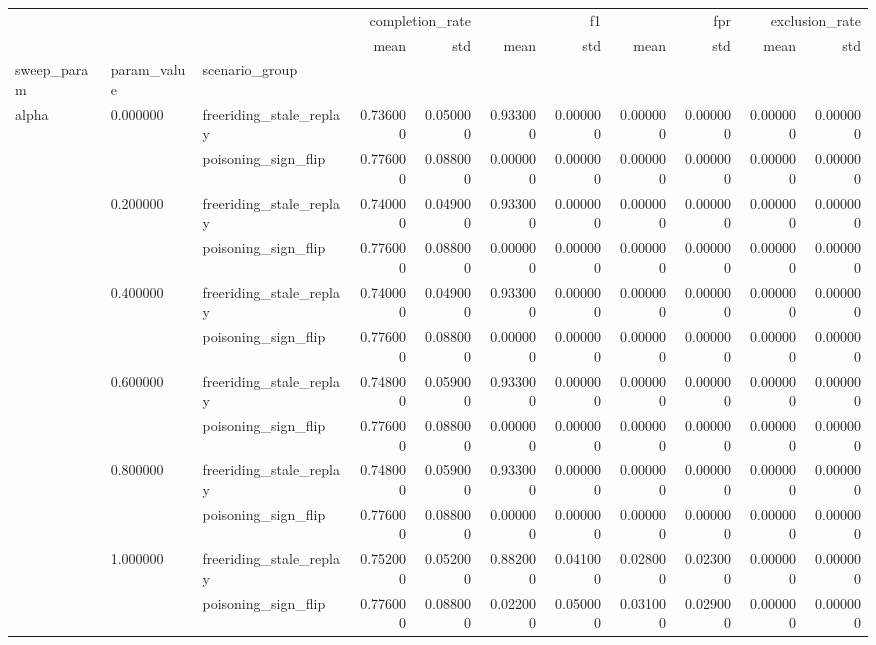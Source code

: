 \begin{tabular}{lllrrrrrrrr}
\toprule
 &  &  & \multicolumn{2}{r}{completion_rate} & \multicolumn{2}{r}{f1} & \multicolumn{2}{r}{fpr} & \multicolumn{2}{r}{exclusion_rate} \\
 &  &  & mean & std & mean & std & mean & std & mean & std \\
sweep_param & param_value & scenario_group &  &  &  &  &  &  &  &  \\
\midrule
\multirow[t]{12}{*}{alpha} & \multirow[t]{2}{*}{0.000000} & freeriding_stale_replay & 0.736000 & 0.050000 & 0.933000 & 0.000000 & 0.000000 & 0.000000 & 0.000000 & 0.000000 \\
 &  & poisoning_sign_flip & 0.776000 & 0.088000 & 0.000000 & 0.000000 & 0.000000 & 0.000000 & 0.000000 & 0.000000 \\
\cline{2-11}
 & \multirow[t]{2}{*}{0.200000} & freeriding_stale_replay & 0.740000 & 0.049000 & 0.933000 & 0.000000 & 0.000000 & 0.000000 & 0.000000 & 0.000000 \\
 &  & poisoning_sign_flip & 0.776000 & 0.088000 & 0.000000 & 0.000000 & 0.000000 & 0.000000 & 0.000000 & 0.000000 \\
\cline{2-11}
 & \multirow[t]{2}{*}{0.400000} & freeriding_stale_replay & 0.740000 & 0.049000 & 0.933000 & 0.000000 & 0.000000 & 0.000000 & 0.000000 & 0.000000 \\
 &  & poisoning_sign_flip & 0.776000 & 0.088000 & 0.000000 & 0.000000 & 0.000000 & 0.000000 & 0.000000 & 0.000000 \\
\cline{2-11}
 & \multirow[t]{2}{*}{0.600000} & freeriding_stale_replay & 0.748000 & 0.059000 & 0.933000 & 0.000000 & 0.000000 & 0.000000 & 0.000000 & 0.000000 \\
 &  & poisoning_sign_flip & 0.776000 & 0.088000 & 0.000000 & 0.000000 & 0.000000 & 0.000000 & 0.000000 & 0.000000 \\
\cline{2-11}
 & \multirow[t]{2}{*}{0.800000} & freeriding_stale_replay & 0.748000 & 0.059000 & 0.933000 & 0.000000 & 0.000000 & 0.000000 & 0.000000 & 0.000000 \\
 &  & poisoning_sign_flip & 0.776000 & 0.088000 & 0.000000 & 0.000000 & 0.000000 & 0.000000 & 0.000000 & 0.000000 \\
\cline{2-11}
 & \multirow[t]{2}{*}{1.000000} & freeriding_stale_replay & 0.752000 & 0.052000 & 0.882000 & 0.041000 & 0.028000 & 0.023000 & 0.000000 & 0.000000 \\
 &  & poisoning_sign_flip & 0.776000 & 0.088000 & 0.022000 & 0.050000 & 0.031000 & 0.029000 & 0.000000 & 0.000000 \\

\end{tabular}
